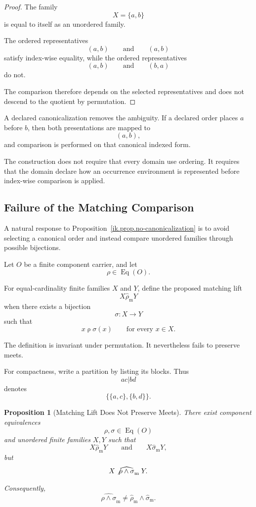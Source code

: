 \documentclass[11pt]{article}
\theoremstyle{plain}
\newtheorem{proposition}[theorem]{Proposition}
\theoremstyle{definition}
\theoremstyle{remark}
\begin{document}
\begin{proof}
  The family
  \[
    X=\{a,b\}
  \]
  is equal to itself as an unordered family.

  The ordered representatives
  \[
    (a,b)
    \qquad\text{and}\qquad
    (a,b)
  \]
  satisfy index-wise equality,
  while the ordered representatives
  \[
    (a,b)
    \qquad\text{and}\qquad
    (b,a)
  \]
  do not.

  The comparison therefore depends
  on the selected representatives
  and does not descend to the quotient
  by permutation.
\end{proof}

A declared canonicalization removes the ambiguity.
If a declared order places \(a\) before \(b\),
then both presentations are mapped to
\[
  (a,b),
\]
and comparison is performed
on that canonical indexed form.

The construction does not require
that every domain use ordering.
It requires that the domain declare
how an occurrence environment is represented
before index-wise comparison is applied.

\subsection{Failure of the Matching Comparison}

A natural response to
Proposition~\ref{ik.prop.no-canonicalization}
is to avoid selecting a canonical order
and instead compare unordered families
through possible bijections.

Let \(O\) be a finite component carrier,
and let
\[
  \rho
  \in
  \operatorname{Eq}(O).
\]

For equal-cardinality finite families
\(X\) and \(Y\),
define the proposed matching lift
\[
  X
  \mathrel{\widehat{\rho}_{\mathrm{m}}}
  Y
\]
when there exists a bijection
\[
  \sigma:
  X
  \longrightarrow
  Y
\]
such that
\[
  x\mathrel{\rho}\sigma(x)
  \qquad
  \text{for every }x\in X.
\]

The definition is invariant under permutation.
It nevertheless fails to preserve meets.

For compactness,
write a partition by listing its blocks.
Thus
\[
  ac|bd
\]
denotes
\[
  \bigl\{
  \{a,c\},
  \{b,d\}
  \bigr\}.
\]

\begin{proposition}[Matching Lift Does Not Preserve Meets]
  \label{ik.prop.matching-no-meets}
  There exist component equivalences
  \[
    \rho,\sigma
    \in
    \operatorname{Eq}(O)
  \]
  and unordered finite families \(X,Y\)
  such that
  \[
    X
    \mathrel{\widehat{\rho}_{\mathrm{m}}}
    Y
    \qquad\text{and}\qquad
    X
    \mathrel{\widehat{\sigma}_{\mathrm{m}}}
    Y,
  \]
  but
  \[
    X
    \mathrel{\not\widehat{
        \rho\wedge\sigma
      }_{\mathrm{m}}}
    Y.
  \]

  Consequently,
  \[
    \widehat{
      \rho\wedge\sigma
    }_{\mathrm{m}}
    \neq
    \widehat{\rho}_{\mathrm{m}}
    \wedge
    \widehat{\sigma}_{\mathrm{m}}.
  \]
\end{proposition}
\end{document}
